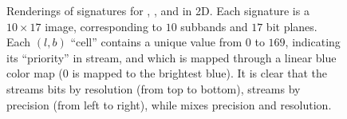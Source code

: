 \begin{figure}[t]
\centering
\caption{Renderings of signatures for \slvl, \sbit, and \swav in 2D. Each signature is a $10\times
17$ image, corresponding to $10$ subbands and $17$ bit planes. Each $(l,b)$ ``cell'' contains a
unique value from $0$ to $169$, indicating its ``priority'' in stream, and which is mapped through a
linear blue color map ($0$ is mapped to the brightest blue). It is clear that the \slvl streams bits
by resolution (from top to bottom), \sbit streams by precision (from left to right), while \swav
mixes precision and resolution.}
\label{fig:example-signatures}
\end{figure}
